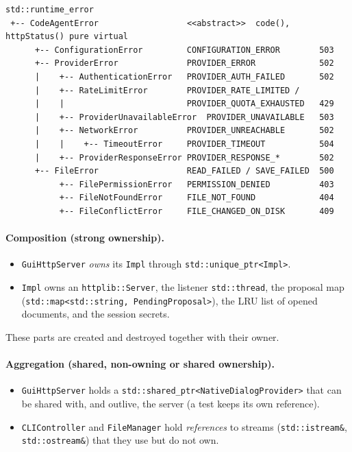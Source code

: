 \documentclass[12pt,a4paper,oneside]{book}
\begin{document}
\begin{lstlisting}[style=codeagentplain,caption={Exception inheritance hierarchy (is-a relationships)},label={lst:ca-hier}]
std::runtime_error
 +-- CodeAgentError                  <<abstract>>  code(), httpStatus() pure virtual
      +-- ConfigurationError         CONFIGURATION_ERROR        503
      +-- ProviderError              PROVIDER_ERROR             502
      |    +-- AuthenticationError   PROVIDER_AUTH_FAILED       502
      |    +-- RateLimitError        PROVIDER_RATE_LIMITED /
      |    |                         PROVIDER_QUOTA_EXHAUSTED   429
      |    +-- ProviderUnavailableError  PROVIDER_UNAVAILABLE   503
      |    +-- NetworkError          PROVIDER_UNREACHABLE       502
      |    |    +-- TimeoutError     PROVIDER_TIMEOUT           504
      |    +-- ProviderResponseError PROVIDER_RESPONSE_*        502
      +-- FileError                  READ_FAILED / SAVE_FAILED  500
           +-- FilePermissionError   PERMISSION_DENIED          403
           +-- FileNotFoundError     FILE_NOT_FOUND             404
           +-- FileConflictError     FILE_CHANGED_ON_DISK       409
\end{lstlisting}

\paragraph{Composition (strong ownership).}
\begin{itemize}
  \item \texttt{GuiHttpServer} \emph{owns} its \texttt{Impl} through
    \texttt{std::\allowbreak{}unique\_ptr<Impl>}.
  \item \texttt{Impl} owns an \texttt{httplib::\allowbreak{}Server}, the listener
    \texttt{std::\allowbreak{}thread}, the proposal map
    (\texttt{std::\allowbreak{}map<std::\allowbreak{}string, PendingProposal>}), the LRU list of opened
    documents, and the session secrets.
\end{itemize}
These parts are created and destroyed together with their owner.

\paragraph{Aggregation (shared, non-owning or shared ownership).}
\begin{itemize}
  \item \texttt{GuiHttpServer} holds a
    \texttt{std::\allowbreak{}shared\_ptr<NativeDialogProvider>} that can be shared with,
    and outlive, the server (a test keeps its own reference).
  \item \texttt{CLIController} and \texttt{FileManager} hold
    \emph{references} to streams (\texttt{std::\allowbreak{}istream\&},
    \texttt{std::\allowbreak{}ostream\&}) that they use but do not own.
\end{itemize}
\end{document}
